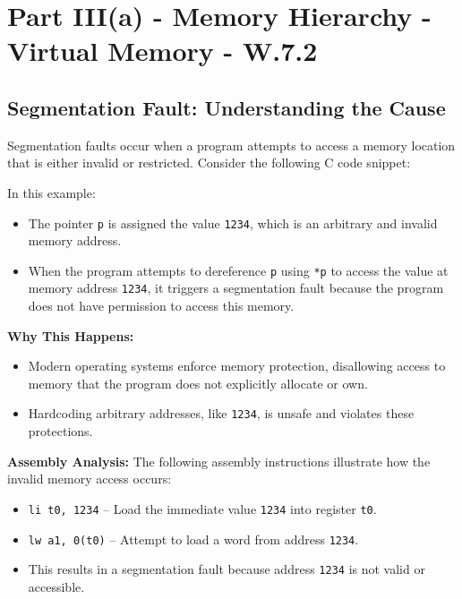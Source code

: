 \chapter{Part III(a) - Memory Hierarchy - Virtual Memory - W.7.2}
\section{Segmentation Fault: Understanding the Cause}

Segmentation faults occur when a program attempts to access a memory location that is either invalid or restricted. Consider the following C code snippet:

\begin{center}
\end{center}

In this example:
\begin{itemize}
    \item The pointer \texttt{p} is assigned the value \texttt{1234}, which is an arbitrary and invalid memory address.
    \item When the program attempts to dereference \texttt{p} using \texttt{*p} to access the value at memory address \texttt{1234}, it triggers a segmentation fault because the program does not have permission to access this memory.
\end{itemize}

\textbf{Why This Happens:}
\begin{itemize}
    \item Modern operating systems enforce memory protection, disallowing access to memory that the program does not explicitly allocate or own.
    \item Hardcoding arbitrary addresses, like \texttt{1234}, is unsafe and violates these protections.
\end{itemize}

\textbf{Assembly Analysis:}
The following assembly instructions illustrate how the invalid memory access occurs:
\begin{itemize}
    \item \texttt{li t0, 1234} -- Load the immediate value \texttt{1234} into register \texttt{t0}.
    \item \texttt{lw a1, 0(t0)} -- Attempt to load a word from address \texttt{1234}.
    \item This results in a segmentation fault because address \texttt{1234} is not valid or accessible.
\end{itemize}

